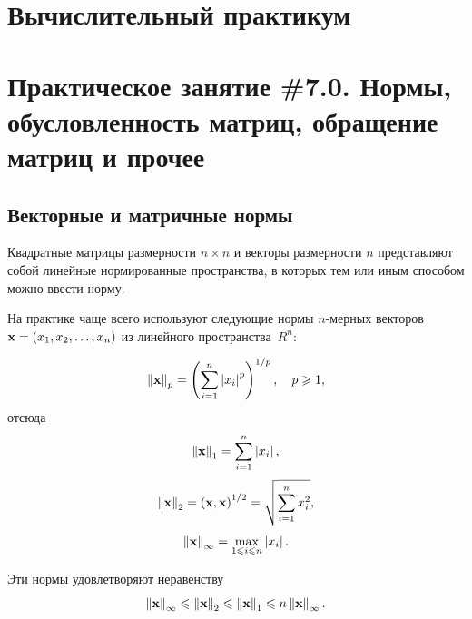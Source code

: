 \documentclass[12pt]{article}
\newcommand{\norm}[1]{\left\| #1 \right\|}
\begin{document}
	\begin{flushright}
	\end{flushright}
	\begin{flushright}
	\end{flushright}
	\section*{Вычислительный практикум}
	\section*{Практическое занятие \#7.0. Нормы, обусловленность матриц, обращение матриц и прочее}
	
	\subsection*{Векторные и матричные нормы}
	Квадратные матрицы размерности $n\times n$ и векторы размерности $n$ представляют собой линейные нормированные пространства, в которых тем или иным способом можно ввести норму.
	
	На практике чаще всего используют следующие нормы $n$-мерных векторов $\bold{x}=\left(x_1,x_2,\ldots,x_n\right)$ из линейного пространства~$R^n$:
	
	\begin{equation}
		\norm{\bold{x}}_p=\left(\sum_{i=1}^{n}\left|x_i\right|^p\right)^{1/p},\quad p\geqslant 1,
	\end{equation}
	отсюда
	\begin{equation}
		\norm{\bold{x}}_1=\sum_{i=1}^{n}\left|x_i\right|,
	\end{equation}
	\begin{equation}
		\norm{\bold{x}}_2=\left(\bold{x},\bold{x}\right)^{1/2}=\sqrt{\sum_{i=1}^n x^2_i},
	\end{equation}
	\begin{equation}
		\norm{\bold{x}}_{\infty}=\max_{1\leqslant i \leqslant n}\left|x_i\right|.
	\end{equation}
	
	Эти нормы удовлетворяют неравенству
	\begin{equation}
		\norm{\bold{x}}_{\infty}\leqslant\norm{\bold{x}}_2\leqslant\norm{\bold{x}}_1\leqslant n\norm{\bold{x}}_{\infty}.
	\end{equation}
	
\end{document}
